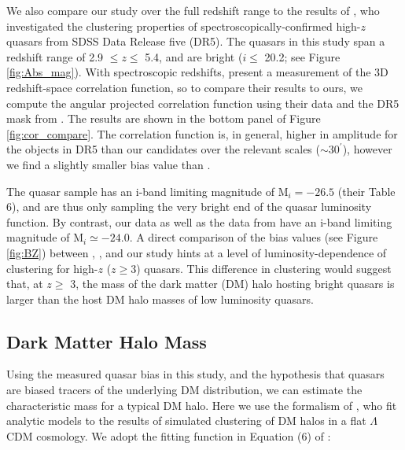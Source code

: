 \documentclass[apj, numberedappendix]{emulateapj}
\begin{document}
We also compare our study over the full redshift range to the results of \citet{Shen2007}, who investigated the clustering properties of spectroscopically-confirmed high-$z$ quasars from SDSS Data Release five (DR5). The quasars in this study span a redshift range of 2.9 $\leq z \leq$ 5.4, and are bright ($i\leq$ 20.2; see Figure \ref{fig:Abs_mag}). With spectroscopic redshifts, \citet{Shen2007} present a measurement of the 3D redshift-space correlation function, so to compare their results to ours, we compute the angular projected correlation function using their data and the DR5 mask from \citet{Ross2009}. The results are shown in the bottom panel of Figure \ref{fig:cor_compare}. The correlation function is, in general, higher in amplitude for the objects in DR5 than our candidates over the relevant scales ($\sim 30^\prime$), however we find a slightly smaller bias value than \citet{Shen2007}.  

The \citet{Shen2007} quasar sample has an i-band limiting magnitude of M$_{i} = -26.5$ (their Table 6), and are thus only sampling the very bright end of the quasar luminosity function. By contrast, our data as well as the data from \citet{He2017} have an i-band limiting magnitude of M$_{i} \simeq -24.0$. A direct comparison of the bias values (see Figure \ref{fig:BZ}) between \citet{Shen2007}, \citet{He2017}, and our study hints at a level of luminosity-dependence of clustering for high-$z$ ($z \geq 3$) quasars. This difference in clustering would suggest that, at $z \geq$ 3, the mass of the dark matter (DM) halo hosting bright quasars is larger than the host DM halo masses of low luminosity quasars. 

\subsection{Dark Matter Halo Mass}
Using the measured quasar bias in this study, and the hypothesis that quasars are biased tracers of the underlying DM distribution, we can estimate the characteristic mass for a typical DM halo. Here we use the formalism of \citet{Tinker2010}, who fit analytic models to the results of simulated clustering of DM halos in a flat $\Lambda$CDM cosmology. We adopt the fitting function in Equation (6) of \citet{Tinker2010}:
\end{document}
